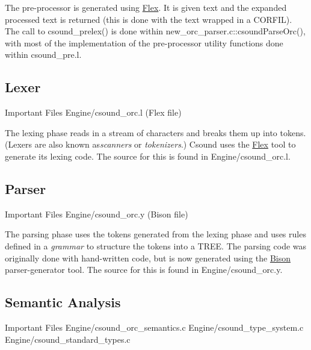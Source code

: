 \documentclass[]{book}
\begin{document}
The pre-processor is generated using \href{http://flex.sourceforge.net/}{Flex}. It is given text and the expanded processed text is returned (this is done with the text wrapped in a CORFIL). The call to csound\_prelex() is done within new\_orc\_parser.c::csoundParseOrc(), with most of the implementation of the pre-processor utility functions done within csound\_pre.l.

\subsection{Lexer}

\begin{bclogo}[couleur=blue!30,arrondi=0.1,ombre=true,logo=\bcetoile]
{Important Files}
Engine/csound\_orc.l (Flex file)
\end{bclogo}

The lexing phase reads in a stream of characters and breaks them up into
tokens. (Lexers are also known as\emph{scanners} or \emph{tokenizers}.)
Csound uses the \href{http://flex.sourceforge.net/}{Flex} tool to
generate its lexing code. The source for this is found in
Engine/csound\_orc.l.


\subsection{Parser}

\begin{bclogo}[couleur=blue!30,arrondi=0.1,ombre=true,logo=\bcetoile]
{Important Files}
Engine/csound\_orc.y (Bison file)
\end{bclogo}

The parsing phase uses the tokens generated from the lexing phase and
uses rules defined in a \emph{grammar} to structure the tokens into a
TREE. The parsing code was originally done with hand-written code, but
is now generated using the
\href{http://www.gnu.org/software/bison/}{Bison} parser-generator tool.
The source for this is found in Engine/csound\_orc.y.


\subsection{Semantic Analysis}

\begin{bclogo}[couleur=blue!30,arrondi=0.1,ombre=true,logo=\bcetoile]
{Important Files}
Engine/csound\_orc\_semantics.c 
Engine/csound\_type\_system.c 
Engine/csound\_standard\_types.c 
\end{bclogo}
\end{document}
